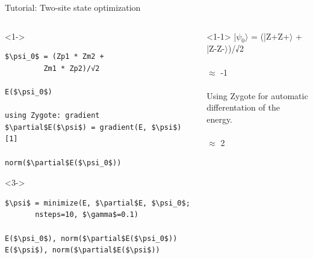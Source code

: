 \begin{frame}[fragile]{Tutorial: Two-site state optimization}

\begin{columns}

\begin{column}{5cm}

\begin{onlyenv}<1->
\begin{lstlisting}[language=JuliaLocal, style=julia, mathescape, basicstyle=\small]
$\psi_0$ = (Zp1 * Zm2 +
         Zm1 * Zp2)/√2

E($\psi_0$)

using Zygote: gradient
$\partial$E($\psi$) = gradient(E, $\psi$)[1]

norm($\partial$E($\psi_0$))
\end{lstlisting}
\end{onlyenv}

\begin{onlyenv}<3->
\begin{lstlisting}[language=JuliaLocal, style=julia, mathescape, basicstyle=\small]
$\psi$ = minimize(E, $\partial$E, $\psi_0$;
       nsteps=10, $\gamma$=0.1)

E($\psi_0$), norm($\partial$E($\psi_0$))
E($\psi$), norm($\partial$E($\psi$))
 \end{lstlisting}
\end{onlyenv}

\end{column}

\begin{column}{5cm}

\begin{onlyenv}<1-1>
|$\psi_0\rangle$ = (|Z+Z+$\rangle$ + \\
           |Z-Z-$\rangle$)/√2 \\
~\\
$\approx$ -1 \\
~\\
Using Zygote for automatic \\
differentation of the energy. \\
~\\
$\approx$ 2 \\
\end{onlyenv}


\end{column}
\end{columns}
\end{frame}
